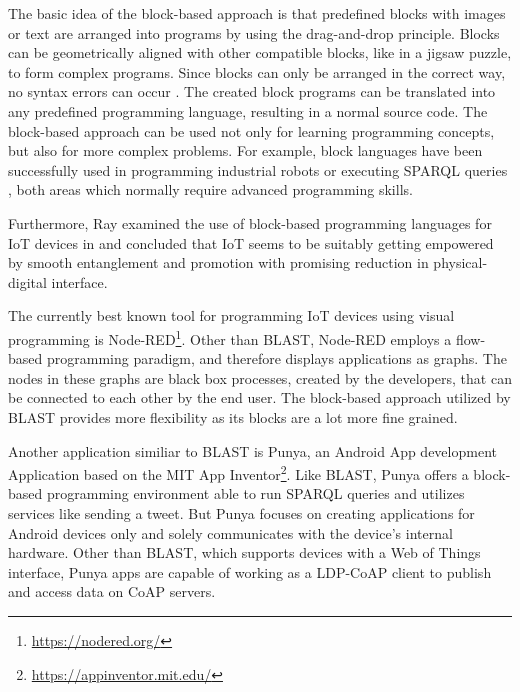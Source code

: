 \documentclass[runningheads]{llncs}
\begin{document}
The basic idea of the block-based approach is that predefined blocks with images or text are arranged into programs by using the drag-and-drop principle.
Blocks can be geometrically aligned with other compatible blocks, like in a jigsaw puzzle, to form complex programs.
Since blocks can only be arranged in the correct way, no syntax errors can occur \cite{10.11453341221} \cite{maloney2010scratch} \cite{10.1145/1089733.1089734} \cite{lye2014review}.
The created block programs can be translated into any predefined programming language, resulting in a normal source code. 
The block-based approach can be used not only for learning programming concepts, but also for more complex problems.
For example, block languages have been successfully used in programming industrial robots \cite{8120406} \cite{ghazal2016framework} \cite{tomlein2017visual} or executing SPARQL queries \cite{7369012}, both areas which normally require advanced programming skills.

Furthermore, Ray examined the use of block-based programming languages for IoT devices in \cite{ray2017survey} and concluded that IoT seems to be suitably getting empowered by smooth entanglement and promotion with promising reduction in physical-digital interface. %

The currently best known tool for programming IoT devices using visual programming is Node-RED\footnote{\url{https://nodered.org/}}.
Other than BLAST, Node-RED employs a flow-based programming paradigm, and therefore displays applications as graphs.
The nodes in these graphs are black box processes, created by the developers, that can be connected to each other by the end user.
The block-based approach utilized by BLAST provides more flexibility as its blocks are a lot more fine grained.

Another application similiar to BLAST is Punya\cite{patton2021punya}, an Android App development Application based on the MIT App Inventor\footnote{\url{https://appinventor.mit.edu/}}.
Like BLAST, Punya offers a block-based programming environment able to run SPARQL queries and utilizes services like sending a tweet.
But Punya focuses on creating applications for Android devices only and solely communicates with the device's internal hardware.
Other than BLAST, which supports devices with a Web of Things interface, Punya apps are capable of working as a LDP-CoAP client to publish and access data on CoAP servers.
\end{document}
